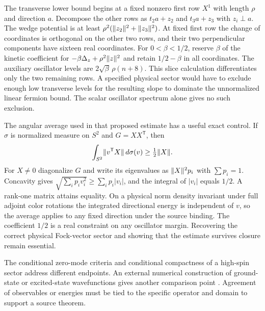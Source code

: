 The transverse lower bound begins at a fixed nonzero first row $X^1$ with length $\rho$ and direction $a$. Decompose the other rows as $t_2a+z_2$ and $t_3a+z_3$ with $z_i\perp a$. The wedge potential is at least $\rho^2(\lVert z_2\rVert^2+\lVert z_3\rVert^2)$. At fixed first row the change of coordinates is orthogonal on the other two rows, and their two perpendicular components have sixteen real coordinates. For $0<\beta<1/2$, reserve $\beta$ of the kinetic coefficient for $-\beta\Delta_z+\rho^2\lVert z\rVert^2$ and retain $1/2-\beta$ in all coordinates. The auxiliary oscillator levels are $2\sqrt\beta\,\rho(n+8)$. This slice calculation differentiates only the two remaining rows. A specified physical sector would have to exclude enough low transverse levels for the resulting slope to dominate the unnormalized linear fermion bound. The scalar oscillator spectrum alone gives no such exclusion.

The angular average used in that proposed estimate has a useful exact control. If $\sigma$ is normalized measure on $S^2$ and $G=XX^{\mathsf T}$, then
\[
 \int_{S^2}\lVert v^{\mathsf T}X\rVert\,d\sigma(v)\ge \tfrac12\lVert X\rVert.
\]
For $X\ne0$ diagonalize $G$ and write its eigenvalues as $\lVert X\rVert^2p_i$ with $\sum p_i=1$. Concavity gives $\sqrt{\sum_i p_i v_i^2}\ge\sum_i p_i|v_i|$, and the integral of $|v_i|$ equals $1/2$. A rank-one matrix attains equality. On a physical norm density invariant under full adjoint color rotations the integrated directional energy is independent of $v$, so the average applies to any fixed direction under the source binding. The coefficient $1/2$ is a real constraint on any oscillator margin. Recovering the correct physical Fock-vector sector and showing that the estimate survives closure remain essential.

The conditional zero-mode criteria and conditional compactness of a high-spin sector address different endpoints. An external numerical construction of ground-state or excited-state wavefunctions gives another comparison point \cite{bajajlin}. Agreement of observables or energies must be tied to the specific operator and domain to support a source theorem.
